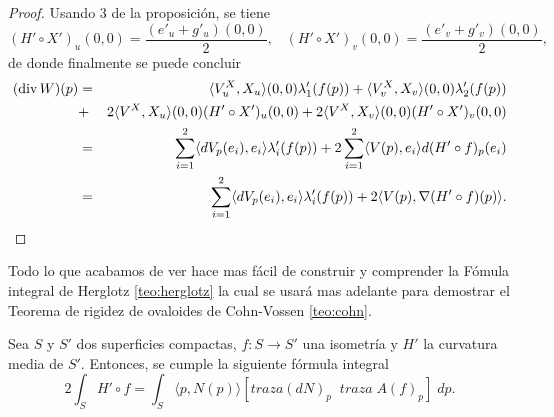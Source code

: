 \begin{proof}
	Usando 3 de la proposición, se tiene
	${ }$\\
	\[
		(H' \circ X')_u (0,0) = \frac{(e'_{u} + g'_{u})(0,0)}{2}, \;\;\; (H' \circ X')_v (0,0) = \frac{(e'_{v} + g'_{v})(0,0)}{2},
	\]
	${ }$\\
	de donde finalmente se puede concluir
	${ }$\\
	\begin{eqnarray*}
		(\hbox{div}\,W)(p)&=& \langle V^X_u,X_u\rangle(0,0) \lambda'_1(f(p))+\langle V^X_v,X_v\rangle(0,0) \lambda'_2(f(p))\\ &+& 2\langle V^X,X_u\rangle(0,0)(H'\circ X')_u(0,0)+2\langle V^X,X_v\rangle(0,0)(H'\circ X')_v(0,0)\\
		&=&\sum_{i=1}^2\langle dV_p(e_i),e_i\rangle\lambda'_i(f(p))+2\sum_{i=1}^2\langle V(p),e_i\rangle d(H'\circ f)_p(e_i)\\
		&=&\sum_{i=1}^2\langle dV_p(e_i),e_i\rangle\lambda'_i(f(p))+2\langle V(p),\nabla(H'\circ f)(p)\rangle.
	\end{eqnarray*}
\end{proof}
${ }$\\

Todo lo que acabamos de ver hace mas fácil de construir y comprender la Fómula integral de Herglotz \ref{teo:herglotz} la cual se usará mas adelante para demostrar el Teorema de rigidez de ovaloides de Cohn-Vossen \ref{teo:cohn}.
${ }$\\

\begin{teorema}\label{teo:herglotz}
	Sea $S$ y $S'$ dos superficies compactas, $f: S \to S'$ una isometría y $H'$ la curvatura media de $S'$. Entonces, se cumple la siguiente fórmula integral
	${ }$\\
	\[
		2 \int_S H' \circ f = \int_S \langle p, N(p) \rangle [traza(dN)_p \;\; traza \; A(f)_p] \; dp.
	\]
	
\end{teorema}


